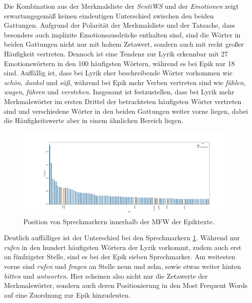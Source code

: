 \documentclass[a4paper,10p]{article}
\begin{document}
Die Kombination aus der Merkmalsliste der \textit{SentiWS} und der \textit{Emotionen} zeigt erwartungsgemäß keinen eindeutigen Unterschied zwischen den beiden Gattungen. Aufgrund der Polarität der Merkmalsliste und der Tatsache, dass besonders auch implizite Emotionsausdrücke enthalten sind, sind die Wörter in beiden Gattungen nicht nur mit hohem Zetawert, sondern auch mit recht großer Häufigkeit vertreten. Dennoch ist eine Tendenz zur Lyrik erkennbar mit 27 Emotionswörtern in den 100 häufigsten Wörtern, während es bei Epik nur 18 sind. Auffällig ist, dass bei Lyrik eher beschreibende Wörter vorkommen wie \textit{schön}, \textit{dunkel} und \textit{süß}, während bei Epik mehr Verben vertreten sind wie \textit{fühlen}, \textit{wagen}, \textit{führen} und \textit{verstehen}. Insgesamt ist festzustellen, dass bei Lyrik mehr Merkmalswörter im ersten Drittel der betrachteten häufigsten Wörter vertreten sind und verschiedene Wörter in den beiden Gattungen weiter vorne liegen, dabei die Häufigkeitswerte aber in einem ähnlichen Bereich liegen. \par 

\begin{figure}
	\includegraphics[width=1\textwidth]{haupt_epik_sprechmarker_mfw.png}
	\caption{Position von Sprechmarkern innerhalb der MFW der Epiktexte.}
	\label{fig:haupt_sprechmarker_in_mfw}
\end{figure}

Deutlich auffälliger ist der Unterschied bei den Sprechmarkern \ref{fig:haupt_sprechmarker_in_mfw}. Während nur \textit{rufen} in den hundert häufigsten Wörtern der Lyrik vorkommt, zudem auch erst an fünfzigster Stelle, sind es bei der Epik sieben Sprechmarker. Am weitesten vorne sind \textit{rufen} und \textit{fragen} an Stelle neun und zehn, sowie etwas weiter hinten \textit{bitten} und \textit{antworten}. Hier scheinen also nicht nur die Zetawerte der Merkmalswörter, sondern auch deren Positionierung in den Most Frequent Words auf eine Zuordnung zur Epik hinzudeuten. 
\end{document}
